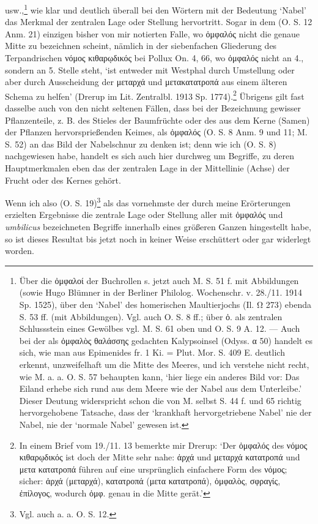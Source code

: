\documentclass[a4paper, 11pt, oneside]{article}
\begin{document}
usw.,\footnote{Über die ὀμφαλοί der Buchrollen s. jetzt auch M. S. 51 f. mit Abbildungen (sowie Hugo Blümner in der Berliner Philolog. Wochenschr. v. 28./11. 1914 Sp. 1525), über den `Nabel' des homerischen Maultierjochs (Il. Ω 273) ebenda S. 53 ff. (mit Abbildungen). Vgl. auch O. S. 8 ff.; über ὀ. als zentralen Schlussstein eines Gewölbes vgl. M. S. 61 oben und O. S. 9 A. 12. --- Auch bei der als ὀμφαλὸς θαλάσσης gedachten Kalypsoinsel (Odyss. α 50) handelt es sich, wie man aus Epimenides fr. 1 Ki. = Plut. Mor. S. 409 E. deutlich erkennt, unzweifelhaft um die Mitte des Meeres, und ich verstehe nicht recht, wie M. a. a. O. S. 57 behaupten kann, `hier liege ein anderes Bild vor: Das Eiland erhebe sich rund aus dem Meere wie der Nabel aus dem Unterleibe.' Dieser Deutung widerspricht schon die von M. selbst S. 44 f. und 65 richtig hervorgehobene Tatsache, dass der `krankhaft hervorgetriebene Nabel' nie der Nabel, nie der `normale Nabel' gewesen ist.} wie klar und deutlich überall bei den Wörtern mit der Bedeutung `Nabel' das Merkmal der zentralen Lage oder Stellung hervortritt. Sogar in dem (O. S. 12 Anm. 21) einzigen bisher von mir notierten Falle, wo ὀμφαλός nicht die genaue Mitte zu bezeichnen scheint, nämlich in der siebenfachen Gliederung des Terpandrischen νόμος κιθαρῳδικός bei Pollux On. 4, 66, wo ὀμφαλός nicht an 4., sondern an 5. Stelle steht, `ist entweder mit Westphal durch Umstellung oder aber durch Ausscheidung der μεταρχά und μετακατατροπά aus einem älteren Schema zu helfen' (Drerup im Lit. Zentralbl. 1913 Sp. 1774).\footnote{In einem Brief vom 19./11. 13 bemerkte mir Drerup: `Der ὀμφαλός des νόμος κιθαρῳδικός ist doch der Mitte sehr nahe: ἀρχά und μεταρχά κατατροπά und μετα κατατροπά führen auf eine ursprünglich einfachere Form des νόμος; sicher: ἀρχά (μεταρχά), κατατροπά (μετα κατατροπά), ὀμφαλὸς, σφραγίς, ἐπίλογος, wodurch ὀμφ. genau in die Mitte gerät.'} Übrigens gilt fast dasselbe auch von den nicht seltenen Fällen, dass bei der Bezeichnung gewisser Pflanzenteile, z. B. des Stieles der Baumfrüchte oder des aus dem Kerne (Samen) der Pflanzen hervorsprießenden Keimes, als ὀμφαλός (O. S. 8 Anm. 9 und 11; M. S. 52) an das Bild der Nabelschnur zu denken ist; denn wie ich (O. S. 8) nachgewiesen habe, handelt es sich auch hier durchweg um Begriffe, zu deren Hauptmerkmalen eben das der zentralen Lage in der Mittellinie (Achse) der Frucht oder des Kernes gehört.

Wenn ich also (O. S. 19)\footnote{Vgl. auch a. a. O. S. 12.} als das vornehmste der durch meine Erörterungen erzielten Ergebnisse die zentrale Lage oder Stellung aller mit ὀμφαλός und \emph{umbilicus} bezeichneten Begriffe innerhalb eines größeren Ganzen hingestellt habe, so ist dieses Resultat bis jetzt noch in keiner Weise erschüttert oder gar widerlegt worden.
\end{document}
